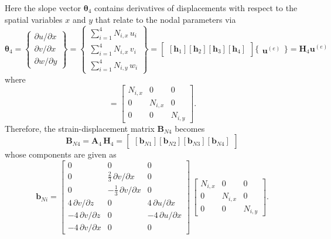 Here the slope vector $\boldsymbol{\theta}_4$ contains derivatives of displacements with respect to the spatial variables $x$ and $y$ that relate to the nodal parameters via
\begin{equation}
	\boldsymbol{\theta}_4 =  \begin{Bmatrix}
		\partial u / \partial x\\
		\partial v / \partial x \\
		\partial w / \partial y
	\end{Bmatrix}
	= \begin{Bmatrix}
		\sum\nolimits_{i=1}^4 N_{i,x} \, u_i\\
		\sum\nolimits_{i=1}^4 N_{i,x} \, v_i \\
		\sum\nolimits_{i=1}^4 N_{i,y} \, w_i
	\end{Bmatrix} 
	= \begin{bmatrix}
		[\mathbf{h}_1] [\mathbf{h}_2] [\mathbf{h}_3] [\mathbf{h}_4] 
	\end{bmatrix} \bigl\{ \begin{matrix} \mathbf{u}^{(e)} \end{matrix} \bigr\}
	= \mathbf{H}_4  \mathbf{u}^{(e)} 
\end{equation}
where 
\begin{equation}
	[\mathbf{h}_i] = \begin{bmatrix}
		N_{i,x} &  0 & 0  \\
		0 & N_{i,x} & 0  \\
		0 & 0 & N_{i,y} \end{bmatrix} . 
\end{equation}
Therefore, the strain-displacement matrix $\mathbf{B}_{N4}$ becomes
\begin{equation}
	\mathbf{B}_{N4} = \mathbf{A}_4 \, \mathbf{H}_4 = \begin{bmatrix}
		[\mathbf{b}_{N1}] [\mathbf{b}_{N2}] [\mathbf{b}_{N3}] [\mathbf{b}_{N4}]
	\end{bmatrix} 
\end{equation}
whose components are given as
\begin{equation}
	\mathbf{b}_{Ni} = \begin{bmatrix}
		0 & 0 &  0   \\
		0 &  \tfrac{2}{3} \, \partial v / \partial x & 0  \\
		0 &  - \tfrac{1}{3} \, \partial v / \partial x & 0 \\
		4 \, \partial v / \partial z &  0 & 4 \, \partial u / \partial x  \\
		-4 \,\partial v / \partial z &  0 & -4 \,\partial u / \partial x  \\
		-4 \,\partial v / \partial x &  0 & 0  \end{bmatrix} \, \begin{bmatrix}
		N_{i,x} &  0 & 0  \\
		0 & N_{i,x} & 0  \\
		0 & 0 & N_{i,y}  \end{bmatrix}.
\end{equation}

